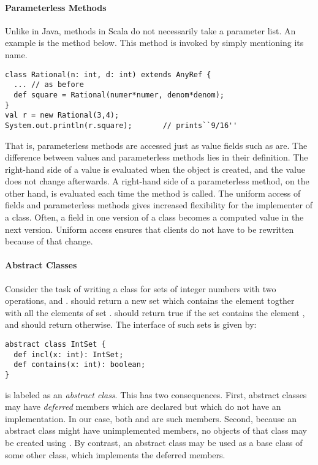 \paragraph{Parameterless Methods}
Unlike in Java, methods in Scala do not necessarily take a
parameter list. An example is the  method below. This
method is invoked by simply mentioning its name. 
\begin{lstlisting}
class Rational(n: int, d: int) extends AnyRef {
  ... // as before
  def square = Rational(numer*numer, denom*denom);
}
val r = new Rational(3,4);
System.out.println(r.square);		// prints``9/16''
\end{lstlisting}
That is, parameterless methods are accessed just as value fields such
as  are. The difference between values and parameterless
methods lies in their definition. The right-hand side of a value is
evaluated when the object is created, and the value does not change
afterwards. A right-hand side of a parameterless method, on the other
hand, is evaluated each time the method is called.  The uniform access
of fields and parameterless methods gives increased flexibility for
the implementer of a class. Often, a field in one version of a class
becomes a computed value in the next version. Uniform access ensures
that clients do not have to be rewritten because of that change.

\paragraph{Abstract Classes}

Consider the task of writing a class for sets of integer numbers with
two operations,  and . 
should return a new set which contains the element  togther
with all the elements of set .  should
return true if the set  contains the element , and
should return  otherwise. The interface of such sets is
given by:  
\begin{lstlisting}
abstract class IntSet {
  def incl(x: int): IntSet;
  def contains(x: int): boolean;
}
\end{lstlisting}
 is labeled as an \emph{abstract class}. This has two
consequences.  First, abstract classes may have {\em deferred} members
which are declared but which do not have an implementation. In our
case, both  and  are such members. Second,
because an abstract class might have unimplemented members, no objects
of that class may be created using . By contrast, an
abstract class may be used as a base class of some other class, which
implements the deferred members.

